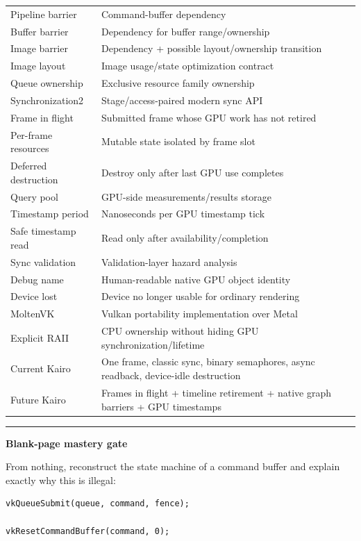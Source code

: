 {\begin{longtable}[]{@{}
  >{\raggedright\arraybackslash}p{}
  >{\raggedright\arraybackslash}p{}@{}}
Pipeline barrier & Command-buffer dependency \\
Buffer barrier & Dependency for buffer range/ownership \\
Image barrier & Dependency + possible layout/ownership transition \\
Image layout & Image usage/state optimization contract \\
Queue ownership & Exclusive resource family ownership \\
Synchronization2 & Stage/access-paired modern sync API \\
Frame in flight & Submitted frame whose GPU work has not retired \\
Per-frame resources & Mutable state isolated by frame slot \\
Deferred destruction & Destroy only after last GPU use completes \\
Query pool & GPU-side measurements/results storage \\
Timestamp period & Nanoseconds per GPU timestamp tick \\
Safe timestamp read & Read only after availability/completion \\
Sync validation & Validation-layer hazard analysis \\
Debug name & Human-readable native GPU object identity \\
Device lost & Device no longer usable for ordinary rendering \\
MoltenVK & Vulkan portability implementation over Metal \\
Explicit RAII & CPU ownership without hiding GPU synchronization/lifetime \\
Current Kairo & One frame, classic sync, binary semaphores, async readback, device-idle destruction \\
Future Kairo & Frames in flight + timeline retirement + native graph barriers + GPU timestamps \\
\end{longtable}
}

\begin{center}\rule{0.5\linewidth}{0.5pt}\end{center}

\textbf{Blank-page mastery gate}

From nothing, reconstruct the state machine of a command buffer and explain exactly why this is illegal:

\begin{verbatim}
vkQueueSubmit(queue, command, fence);

vkResetCommandBuffer(command, 0);
\end{verbatim}

